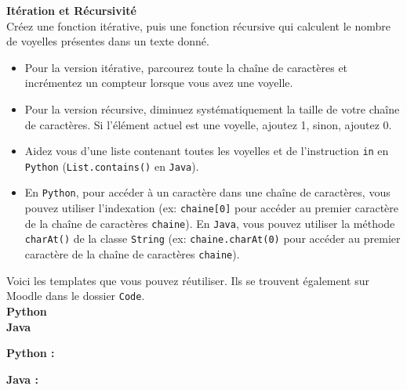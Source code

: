 \begin{Exercice}[15 minutes]\textbf{Itération et Récursivité} \\
Créez une fonction itérative, puis une fonction récursive qui calculent le nombre de voyelles présentes dans un texte donné. \\

\begin{conseil}
    \begin{itemize}
        \item Pour la version itérative, parcourez toute la chaîne de caractères et incrémentez un compteur lorsque vous avez une voyelle.
        \item Pour la version récursive, diminuez systématiquement la taille de votre chaîne de caractères. Si l'élément actuel est une voyelle, ajoutez 1, sinon, ajoutez 0.
        \item Aidez vous d'une liste contenant toutes les voyelles et de l'instruction \lstinline{in} en \lstinline{Python} (\lstinline{List.contains()} en \lstinline{Java}).
        \item En \lstinline{Python}, pour accéder à un caractère dans une chaîne de caractères, vous pouvez utiliser l'indexation (ex: \lstinline{chaine[0]} pour accéder au premier caractère de la chaîne de caractères \lstinline{chaine}). En \lstinline{Java}, vous pouvez utiliser la méthode \lstinline{charAt()} de la classe \lstinline{String} (ex: \lstinline{chaine.charAt(0)} pour accéder au premier caractère de la chaîne de caractères \lstinline{chaine}).
    \end{itemize}
\end{conseil}

Voici les templates que vous pouvez réutiliser. Ils se trouvent également sur Moodle dans le dossier \lstinline{Code}. \\

\textbf{Python} \\
     

\textbf{Java} \\
    

    
\begin{solution}
\textbf{Python :} \\
    
    
\end{solution}


\begin{solution}   
\textbf{Java :} \\

    
    
    
    
\end{solution}

\end{Exercice}

